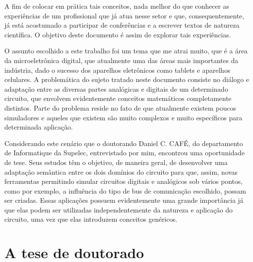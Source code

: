 \documentclass{article}
\begin{document}
\vspace{12pt}

A fim de colocar em prática tais conceitos, nada melhor do que conhecer as
experiências de um profissional que já atua nesse setor e que, consequentemente,
já está acostumado a participar de conferências e a escrever textos de natureza
científica. O objetivo deste documento é assim de explorar tais experiências.  

\vspace{12pt}

O assunto escolhido a este trabalho foi um tema que me atrai muito, que é a área
da microeletrônica digital, que atualmente uma das áreas mais importantes da
indústria, dado o sucesso dos aparelhos eletrônicos como tablets e aparelhos
celulares. A problemática do sujeto tratado neste documento consiste no diálogo
e adaptação entre as diversas partes analógicas e digitais de um determinado
circuito, que envolvem evidentemente conceitos matemáticos completamente
distintos. Parte do problema reside no fato de que atualmente existem poucos
simuladores e aqueles que existem são muito complexos e muito específicos para
determinada aplicação.

\vspace{12pt}

Considerando este cenário que o doutorando Daniel C. CAFÉ, do departamento de
Informatique da Supelec, entrevistado por mim, encontrou uma oportunidade de
tese.  Seus estudos têm o objetivo, de maneira geral, de desenvolver uma
adaptação semântica entre os dois domínios do circuito para que, assim, novas 
ferramentas permitindo simular circuitos digitais e analógicos sob vários
pontos, como por exemplo, a influência do tipo de bus de comunicação escolhido,
possam ser criadas. Essas aplicações possuem evidentemente uma grande
importância já que elas podem ser utilizadas independentemente da natureza e
aplicação do circuito, uma vez que elas introduzem conceitos genéricos.


\newpage


\section{A tese de doutorado}
\end{document}
